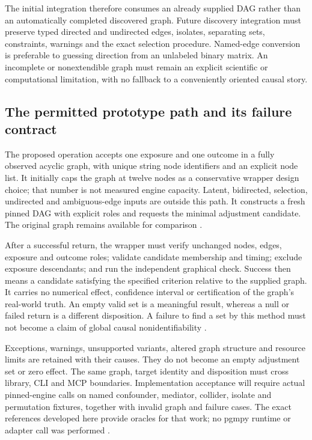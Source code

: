 The initial integration therefore consumes an already supplied DAG rather
than an automatically completed discovered graph. Future discovery
integration must preserve typed directed and undirected edges, isolates,
separating sets, constraints, warnings and the exact selection procedure.
Named-edge conversion is preferable to guessing direction from an unlabeled
binary matrix. An incomplete or nonextendible graph must remain an explicit
scientific or computational limitation, with no fallback to a conveniently
oriented causal story.

\subsection{The permitted prototype path and its failure contract}

The proposed operation accepts one exposure and one outcome in a fully
observed acyclic graph, with unique string node identifiers and an explicit
node list. It initially caps the graph at twelve nodes as a conservative
wrapper design choice; that number is not measured engine capacity.
Latent, bidirected, selection, undirected and ambiguous-edge inputs are
outside this path. It constructs a fresh pinned DAG with explicit roles
and requests the minimal adjustment candidate. The original graph remains
available for comparison \cite{exec13_pgmpy_reuse_oracle}.

After a successful return, the wrapper must verify unchanged nodes, edges,
exposure and outcome roles; validate candidate membership and timing;
exclude exposure descendants; and run the independent graphical check.
Success then means a candidate satisfying the specified criterion relative
to the supplied graph. It carries no numerical effect, confidence interval
or certification of the graph's real-world truth. An empty valid set is
a meaningful result, whereas a null or failed return is a different
disposition. A failure to find a set by this method must not become a
claim of global causal nonidentifiability
\cite{exec13_pgmpy_reuse_oracle}.

Exceptions, warnings, unsupported variants, altered graph structure and
resource limits are retained with their causes. They do not become an
empty adjustment set or zero effect. The same graph, target identity and
disposition must cross library, CLI and MCP boundaries. Implementation
acceptance will require actual pinned-engine calls on named confounder,
mediator, collider, isolate and permutation fixtures, together with invalid
graph and failure cases. The exact references developed here provide
oracles for that work; no pgmpy runtime or adapter call was performed
\cite{exec13_pgmpy_reuse_oracle}.


